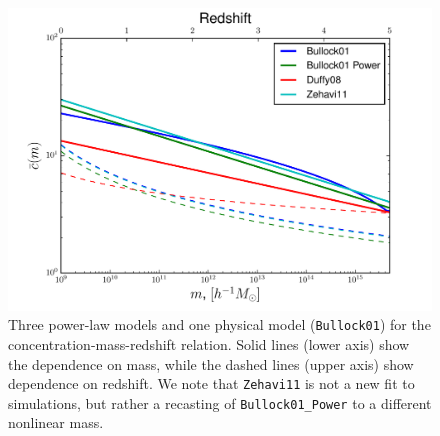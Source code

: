 \documentclass[5p]{elsarticle}
\begin{document}
\begin{figure}
  \centering
  \includegraphics[width=\linewidth]{figures/concentration.pdf}
  \caption[Concentration-mass-redshift relation for various models in the literature]{Three power-law models and one physical model (\texttt{Bullock01}) for the concentration-mass-redshift relation. Solid lines (lower axis) show the dependence on mass, while the dashed lines (upper axis) show dependence on redshift. We note that \texttt{Zehavi11} is not a new fit to simulations, but rather a recasting of \texttt{Bullock01\_Power} to a different nonlinear mass.  }
  \label{fig:concentration}
\end{figure}

\end{document}
